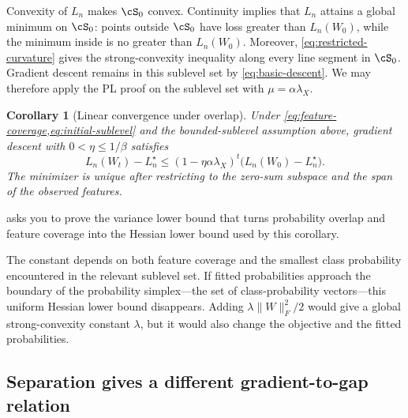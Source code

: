 \documentclass[11pt,twoside]{article}
\newtheorem{corollary}[theorem]{Corollary}
\theoremstyle{definition}
\theoremstyle{remark}
\begin{document}
Convexity of $L_n$ makes $\cS_0$ convex. Continuity implies that $L_n$ attains
a global minimum on $\cS_0$: points outside $\cS_0$ have loss greater than
$L_n(W_0)$, while the minimum inside is no greater than $L_n(W_0)$. Moreover,
\cref{eq:restricted-curvature} gives the strong-convexity inequality along
every line segment in $\cS_0$. Gradient descent remains in this sublevel set by
\cref{eq:basic-descent}. We may therefore apply the PL proof on the sublevel
set with $\mu=\alpha\lambda_X$.

\begin{corollary}[Linear convergence under overlap]
\label{cor:softmax-overlap-linear}
Under \cref{eq:feature-coverage,eq:initial-sublevel} and the bounded-sublevel
assumption above, gradient descent with $0<\eta\le1/\beta$ satisfies
\begin{equation}
 L_n(W_t)-L_n^\star
 \le(1-\eta\alpha\lambda_X)^t
       \bigl(L_n(W_0)-L_n^\star\bigr).
 \label{eq:softmax-overlap-rate}
\end{equation}
The minimizer is unique after restricting to the zero-sum subspace and the
span of the observed features.
\end{corollary}

 asks you to prove the variance lower bound that
turns probability overlap and feature coverage into the Hessian lower bound
used by this corollary.

The constant depends on both feature coverage and the smallest class
probability encountered in the relevant sublevel set. If fitted probabilities
approach the boundary of the probability simplex---the set of class-probability
vectors---this uniform Hessian lower bound disappears.
Adding $\lambda\|W\|_F^2/2$ would give a global strong-convexity constant
$\lambda$, but it would also change the objective and the fitted
probabilities.

\subsection{Separation gives a different gradient-to-gap relation}
\label{sec:softmax-separation}
\end{document}
